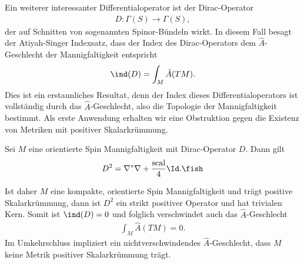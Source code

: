 \documentclass[%
	paper=a5,%
	fleqn,%
	DIV=18,%
	BCOR=0mm,
	fontsize=11pt,
	titlepage=false,%
	bibliography=totoc,
	DIV=18,%
	twoside=true,
	pdftitle=Riemannsche Geometrie,
	pdfauthor=Uwe Semmelmann,
	numbers=noendperiod]%
	{scrbook}
\begin{document}
Ein weiterer interessanter Differentialoperator ist der Dirac-Operator
\begin{align*}
D: \Gamma(S)\to \Gamma(S),
\end{align*}
der auf Schnitten von sogenannten Spinor-Bündeln wirkt. In diesem Fall besagt der Atiyah-Singer Indexsatz, dass der Index des Dirac-Operators dem $\hat{A}$-Geschlecht der Mannigfaltigkeit entspricht
\begin{align*}
\ind(D) = \int_{M} \hat{A}(TM).
\end{align*}
Dies ist ein erstaunliches Resultat, denn der Index dieses Differentialoperators ist vollständig durch das  $\hat{A}$-Geschlecht, also die Topologie der Mannigfaltigkeit bestimmt. Als erste Anwendung erhalten wir eine Obstruktion gegen die Existenz von Metriken mit positiver Skalarkrümmung.

\begin{prop}
Sei $M$ eine orientierte Spin Mannigfaltigkeit mit Dirac-Operator $D$. Dann gilt
\begin{align*}
D^2 = \nabla^* \nabla + \frac{\mathrm{scal}}{4}\Id.\fish
\end{align*}
\end{prop}

Ist daher $M$ eine kompakte, orientierte Spin Mannigfaltigkeit und trägt positive Skalarkrümmung, dann ist $D^2$ ein strikt positiver Operator und hat trivialen Kern. Somit ist $\ind(D) = 0$ und folglich verschwindet auch das $\hat{A}$-Geschlecht
\begin{align*}
\int_{M} \hat{A}(TM) = 0.
\end{align*}
Im Umkehrschluss impliziert ein nichtverschwindendes $\hat{A}$-Geschlecht, dass $M$ keine Metrik positiver Skalarkrümmung trägt.
\end{document}
